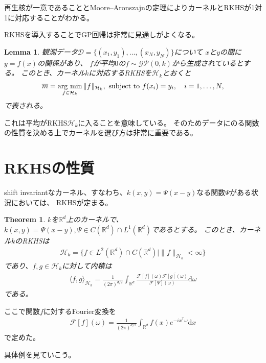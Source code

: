 \documentclass{article}
\newcommand{\diff}{\mathrm{d}}
\newtheorem{theorem}{Theorem}[section]
\newtheorem{lem}{Lemma}[section]
\newcommand{\argmin}{\mathop{\rm arg~min}\limits}
\begin{document}
再生核が一意であることとMoore--Aronszajnの定理によりカーネルとRKHSが1対1に対応することがわかる。

RKHSを導入することでGP回帰は非常に見通しがよくなる。

\begin{lem}
観測データ$\mathcal{D}=\{(x_{1},y_{1}),\dots,(x_{N},y_{N})\}$について
$x$と$y$の間に$y=f(x)$の関係があり、
$f$が平均$0$の$f\sim\mathcal{GP}(0,k)$から生成されているとする。
このとき、カーネル$k$に対応するRKHSを$\mathcal{H}_{k}$とおくと
\begin{align}
    \overline{m} = \argmin_{f\in\mathcal{H}_{k}}\|f\|_{\mathcal{H}_{k}},
    \textrm{ subject to } f(x_{i}) = y_{i},\quad i=1,\dots,N,
\end{align}
で表される。
\end{lem}

これは平均がRKHS$\mathcal{H}_{k}$に入ることを意味している。
そのためデータにのる関数の性質を決める上でカーネルを選び方は非常に重要である。

\section{RKHSの性質}
shift invariantなカーネル、すなわち、$k(x,y)=\Psi(x-y)$なる関数$\Psi$がある状況においては、
RKHSが定まる。

\begin{theorem}
    $k$を$\mathbb{R}^{d}$上のカーネルで、$k(x,y)=\Psi(x-y),\Psi\in C(\mathbb{R}^{d})\cap L^{1}(\mathbb{R}^{d})$であるとする。
    このとき、カーネル$k$のRKHSは
    \begin{align}
        \mathcal{H}_{k}=\{f\in L^{2}(\mathbb{R}^{d}) \cap C(\mathbb{R}^{d}) \mid \|f\|_{\mathcal{H}_{k}}<\infty \}
    \end{align}
    であり、$f,g\in \mathcal{H}_{k}$に対して内積は
    \begin{align}
        \langle f,g \rangle_{\mathcal{H}_{k}} = \frac{1}{(2\pi)^{d/2}}\int_{\mathbb{R}^{d}}\frac{\mathcal{F}[f](\omega)\overline{\mathcal{F}[g](\omega)}}{\mathcal{F}[\Psi](\omega)}\diff\omega
    \end{align}
    である。
\end{theorem}

ここで関数$f$に対するFourier変換を
\begin{align}
    \mathcal{F}[f](\omega)=\frac{1}{(2\pi)^{d/2}}\int_{\mathbb{R}^{d}}f(x)e^{-ix^{\mathsf{T}}\omega}\diff x
\end{align}
で定めた。

具体例を見ていこう。
\end{document}
